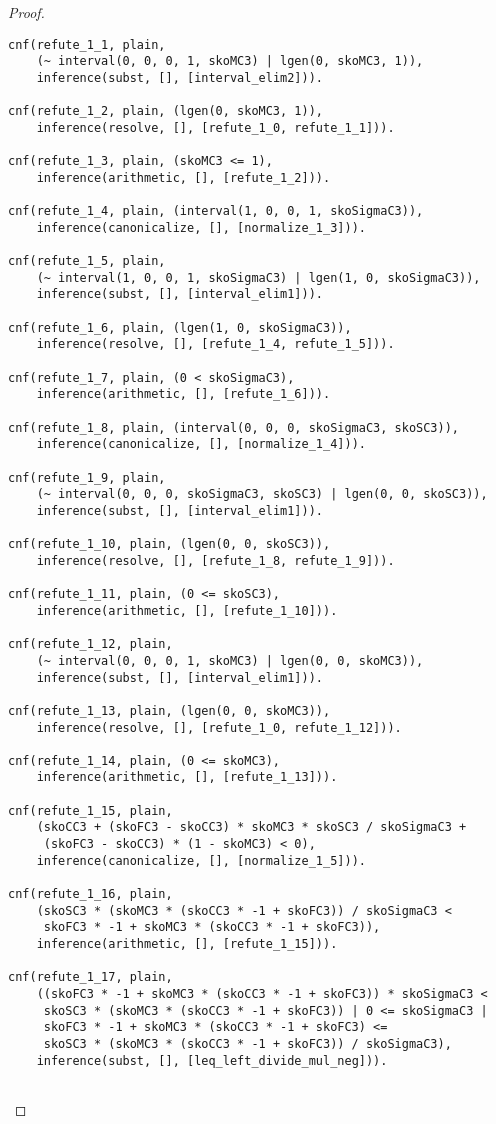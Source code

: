 \begin{proof}
\begin{verbatim}
cnf(refute_1_1, plain,
    (~ interval(0, 0, 0, 1, skoMC3) | lgen(0, skoMC3, 1)),
    inference(subst, [], [interval_elim2])).

cnf(refute_1_2, plain, (lgen(0, skoMC3, 1)),
    inference(resolve, [], [refute_1_0, refute_1_1])).

cnf(refute_1_3, plain, (skoMC3 <= 1),
    inference(arithmetic, [], [refute_1_2])).

cnf(refute_1_4, plain, (interval(1, 0, 0, 1, skoSigmaC3)),
    inference(canonicalize, [], [normalize_1_3])).

cnf(refute_1_5, plain,
    (~ interval(1, 0, 0, 1, skoSigmaC3) | lgen(1, 0, skoSigmaC3)),
    inference(subst, [], [interval_elim1])).

cnf(refute_1_6, plain, (lgen(1, 0, skoSigmaC3)),
    inference(resolve, [], [refute_1_4, refute_1_5])).

cnf(refute_1_7, plain, (0 < skoSigmaC3),
    inference(arithmetic, [], [refute_1_6])).

cnf(refute_1_8, plain, (interval(0, 0, 0, skoSigmaC3, skoSC3)),
    inference(canonicalize, [], [normalize_1_4])).

cnf(refute_1_9, plain,
    (~ interval(0, 0, 0, skoSigmaC3, skoSC3) | lgen(0, 0, skoSC3)),
    inference(subst, [], [interval_elim1])).

cnf(refute_1_10, plain, (lgen(0, 0, skoSC3)),
    inference(resolve, [], [refute_1_8, refute_1_9])).

cnf(refute_1_11, plain, (0 <= skoSC3),
    inference(arithmetic, [], [refute_1_10])).

cnf(refute_1_12, plain,
    (~ interval(0, 0, 0, 1, skoMC3) | lgen(0, 0, skoMC3)),
    inference(subst, [], [interval_elim1])).

cnf(refute_1_13, plain, (lgen(0, 0, skoMC3)),
    inference(resolve, [], [refute_1_0, refute_1_12])).

cnf(refute_1_14, plain, (0 <= skoMC3),
    inference(arithmetic, [], [refute_1_13])).

cnf(refute_1_15, plain,
    (skoCC3 + (skoFC3 - skoCC3) * skoMC3 * skoSC3 / skoSigmaC3 +
     (skoFC3 - skoCC3) * (1 - skoMC3) < 0),
    inference(canonicalize, [], [normalize_1_5])).

cnf(refute_1_16, plain,
    (skoSC3 * (skoMC3 * (skoCC3 * -1 + skoFC3)) / skoSigmaC3 <
     skoFC3 * -1 + skoMC3 * (skoCC3 * -1 + skoFC3)),
    inference(arithmetic, [], [refute_1_15])).

cnf(refute_1_17, plain,
    ((skoFC3 * -1 + skoMC3 * (skoCC3 * -1 + skoFC3)) * skoSigmaC3 <
     skoSC3 * (skoMC3 * (skoCC3 * -1 + skoFC3)) | 0 <= skoSigmaC3 |
     skoFC3 * -1 + skoMC3 * (skoCC3 * -1 + skoFC3) <=
     skoSC3 * (skoMC3 * (skoCC3 * -1 + skoFC3)) / skoSigmaC3),
    inference(subst, [], [leq_left_divide_mul_neg])).


\end{verbatim}
\end{proof}
